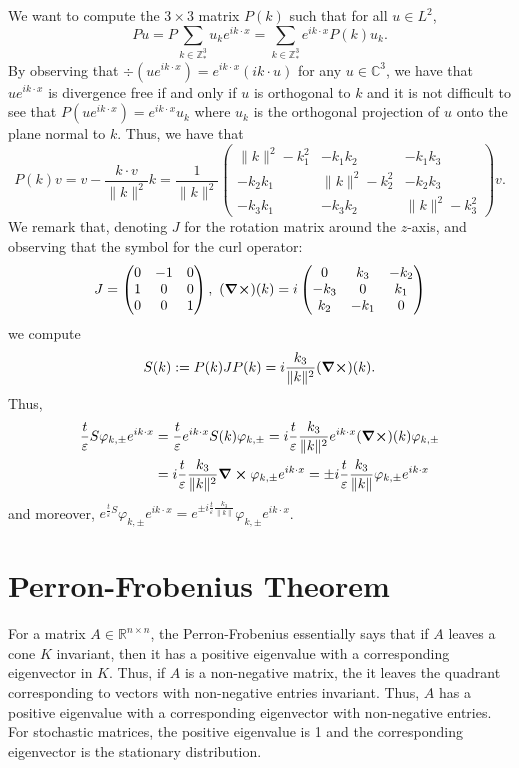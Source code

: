 \documentclass[]{article}
\theoremstyle{definition}
\theoremstyle{definition}
\let\phi\varphi
\let\epsilon\varepsilon
\begin{document}
We want to compute the \(3 \times 3\) matrix \(P(k)\) such that for all \(u \in L^2\), 
\[Pu = P \sum_{k \in \mathbb{Z}^3_*} u_k e^{ik \cdot x} = \sum_{k \in \mathbb{Z}^3_*} e^{ik \cdot x} P(k) u_k.\]
By observing that \(\div(u e^{ik \cdot x}) = e^{ik \cdot x} (ik \cdot u)\) for any \(u \in \mathbb{C}^3\), 
we have that \(u e^{ik \cdot x}\) is divergence free if and only if \(u\) is orthogonal to \(k\) 
and it is not difficult to see that \(P(u e^{ik \cdot x}) = e^{ik \cdot x} u_k\) where \(u_k\) is the 
orthogonal projection of \(u\) onto the plane normal to \(k\). Thus, we have that 
\[P(k)v = v - \frac{k \cdot v}{\|k\|^2}k = \frac{1}{\|k\|^2}\begin{pmatrix}
  \|k\|^2 - k_1^2 & -k_1 k_2 & -k_1 k_3\\
  -k_2 k_1 & \|k\|^2 - k_2^2 & -k_2 k_3\\
  -k_3 k_1 & -k_3 k_2 & \|k\|^2 - k_3^2
\end{pmatrix}v.\]
We remark that, denoting \(J\) for the rotation matrix around the \(z\)-axis, and observing that 
the symbol for the curl operator:
\[J = \begin{pmatrix}
  0 & -1 & 0\\
  1 & 0 & 0\\
  0 & 0 & 1
\end{pmatrix}, \
(\curl)(k) = i\begin{pmatrix}
  0 & k_3 & -k_2\\
  -k_3 & 0 & k_1\\
  k_2 & -k_1 & 0
\end{pmatrix}\]
we compute 
\[S(k) := P(k)JP(k) = i\frac{k_3}{\|k\|^2}(\curl)(k).\]
Thus, 
\begin{align*}
  \frac{t}{\epsilon}S \phi_{k, \pm} e^{ik \cdot x} 
  & = \frac{t}{\epsilon} e^{ik \cdot x} S(k) \phi_{k, \pm} 
    = i\frac{t}{\epsilon}\frac{k_3}{\|k\|^2} e^{ik \cdot x} (\curl)(k)\phi_{k, \pm}\\
  & = i\frac{t}{\epsilon}\frac{k_3}{\|k\|^2} \curl{\phi_{k, \pm} e^{ik \cdot x}} 
    = \pm i\frac{t}{\epsilon}\frac{k_3}{\|k\|} \phi_{k, \pm} e^{ik \cdot x}
\end{align*}
and moreover, \(e^{\frac{t}{\epsilon}S} \phi_{k, \pm} e^{ik \cdot x} 
  = e^{\pm i\frac{t}{\epsilon}\frac{k_3}{\|k\|}} \phi_{k, \pm} e^{ik \cdot x}\).


\section*{Perron-Frobenius Theorem}

For a matrix \(A \in \mathbb{R}^{n \times n}\), the Perron-Frobenius essentially says that if 
\(A\) leaves a cone \(K\) invariant, then it has a positive eigenvalue with a corresponding eigenvector 
in \(K\). Thus, if \(A\) is a non-negative matrix, the it leaves the quadrant corresponding to 
vectors with non-negative entries invariant. Thus, \(A\) has a positive eigenvalue with a corresponding 
eigenvector with non-negative entries. For stochastic matrices, the positive eigenvalue is 1 and the
corresponding eigenvector is the stationary distribution.



\end{document}
